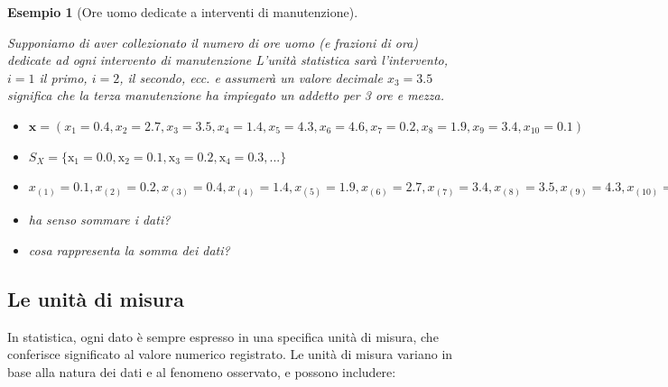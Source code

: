 \documentclass[
  11pt,
]{book}
\providecommand{\tightlist}{%
  \setlength{\itemsep}{0pt}\setlength{\parskip}{0pt}}
\theoremstyle{mytheoremstyle}
\theoremstyle{mydefstyle}
\newtheorem{example}{{Esempio}}[section]
\begin{document}
\begin{example}[Ore uomo dedicate a interventi di manutenzione]

\(\phantom{.}\)

Supponiamo di aver collezionato il numero di ore uomo (e frazioni di ora) dedicate
ad ogni intervento di manutenzione L'unità statistica sarà l'intervento, \(i=1\) il primo, \(i=2\), il secondo, ecc. e assumerà un valore decimale \(x_3=3.5\) significa che la terza manutenzione ha impiegato un addetto per 3 ore e mezza.

\begin{itemize}
\tightlist
\item
  \(\mathbf{x}=(x_1 = 0.4, x_2 =2.7, x_3 =3.5, x_4=1.4,x_5=4.3,x_6=4.6,
  x_7=0.2,x_8=1.9,x_9=3.4,x_{10}=0.1)\)
\item
  \(S_X=\{\mathrm{x}_1 = 0.0,\mathrm{x}_2 = 0.1,\mathrm{x}_3=0.2,\mathrm{x}_4=0.3,...\}\)
\item
  \(x_{(1)}=0.1, x_{(2)}=0.2, x_{(3)}=0.4, x_{(4)}=1.4, x_{(5)}=1.9, x_{(6)}=2.7, x_{(7)}=3.4, x_{(8)}=3.5, x_{(9)}=4.3, x_{(10)}=4.6\)
\item
  ha senso sommare i dati?
\item
  cosa rappresenta la somma dei dati?
\end{itemize}

\end{example}

\subsection{Le unità di misura}\label{le-unituxe0-di-misura}

In statistica, ogni dato è sempre espresso in una specifica unità di misura, che conferisce significato al valore numerico registrato. Le unità di misura variano in base alla natura dei dati e al fenomeno osservato, e possono includere:
\end{document}
